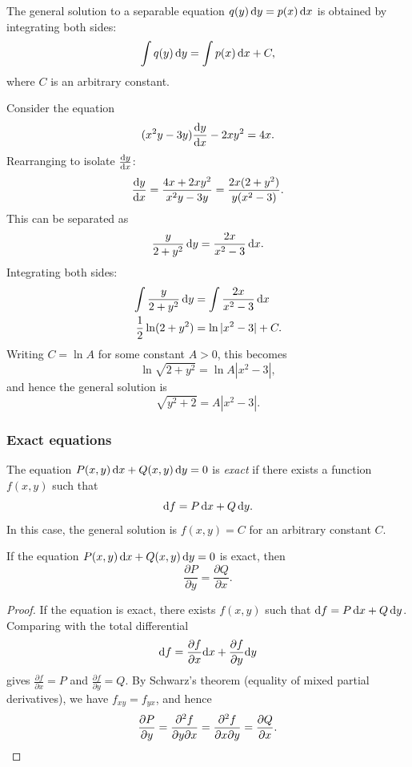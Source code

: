 \documentclass[a4paper]{article}
\begin{document}
\begin{prop}
  The general solution to a separable equation $q(y)\,\mathrm{d} y = p(x)\,\mathrm{d} x$ is obtained by integrating both sides:
  \[
    \int q(y)\,\mathrm{d} y = \int p(x)\,\mathrm{d} x + C,
  \]
  where $C$ is an arbitrary constant.
\end{prop}

\begin{eg}
  Consider the equation
  \[
    (x^2y - 3y)\frac{\mathrm{d} y}{\mathrm{d} x} - 2xy^2 = 4x.
  \]
  Rearranging to isolate $\frac{\mathrm{d} y}{\mathrm{d} x}$:
  \[
    \frac{\mathrm{d} y}{\mathrm{d} x} = \frac{4x + 2xy^2}{x^2y - 3y} = \frac{2x(2 + y^2)}{y(x^2 - 3)}.
  \]
  This can be separated as
  \[
    \frac{y}{2 + y^2}\, \mathrm{d} y = \frac{2x}{x^2 - 3}\,\mathrm{d} x.
  \]
  Integrating both sides:
  \begin{align*}
    \int \frac{y}{2 + y^2}\, \mathrm{d} y &= \int\frac{2x}{x^2 - 3}\,\mathrm{d} x\\
    \frac{1}{2}\ln(2 + y^2) &= \ln |x^2 - 3| + C.
  \end{align*}
  Writing $C = \ln A$ for some constant $A > 0$, this becomes
  \[
    \ln \sqrt{2 + y^2} = \ln A|x^2 - 3|,
  \]
  and hence the general solution is
  \[
    \sqrt{y^2 + 2} = A|x^2 - 3|.
  \]
\end{eg}
\subsubsection{Exact equations}
\begin{defi}
  The equation $P(x, y)\,\mathrm{d} x + Q(x, y)\,\mathrm{d} y = 0$ is \emph{exact} if there exists a function $f(x, y)$ such that
  \[
    \mathrm{d} f = P\,\mathrm{d} x + Q\,\mathrm{d} y.
  \]
  In this case, the general solution is $f(x, y) = C$ for an arbitrary constant $C$.
\end{defi}

\begin{prop}\label{prop:exact-necessary}
  If the equation $P(x, y)\,\mathrm{d} x + Q(x, y)\,\mathrm{d} y = 0$ is exact, then
  \[
    \frac{\partial P}{\partial y} = \frac{\partial Q}{\partial x}.
  \]
\end{prop}
\begin{proof}
  If the equation is exact, there exists $f(x,y)$ such that $\mathrm{d} f = P\,\mathrm{d} x + Q\,\mathrm{d} y$. Comparing with the total differential
  \[
    \mathrm{d} f = \frac{\partial f}{\partial x}\mathrm{d} x + \frac{\partial f}{\partial y}\mathrm{d} y
  \]
  gives $\frac{\partial f}{\partial x} = P$ and $\frac{\partial f}{\partial y} = Q$. By Schwarz's theorem (equality of mixed partial derivatives), we have $f_{xy} = f_{yx}$, and hence
  \[
    \frac{\partial P}{\partial y} = \frac{\partial^2 f}{\partial y \partial x} = \frac{\partial^2 f}{\partial x \partial y} = \frac{\partial Q}{\partial x}. \qedhere
  \]
\end{proof}
\end{document}
